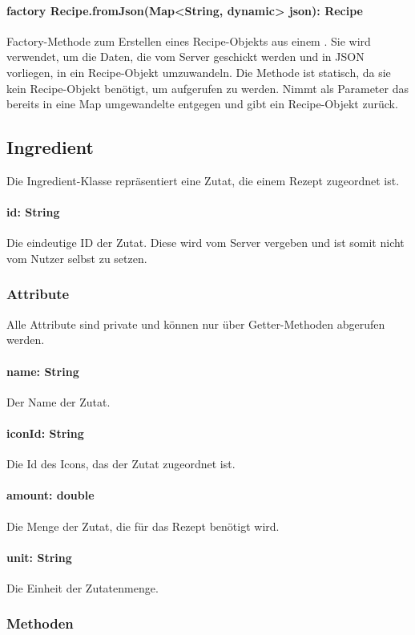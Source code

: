 \documentclass[parskip=full]{scrartcl}
\begin{document}
\paragraph{factory Recipe.fromJson(Map<String, dynamic> json): Recipe}
Factory-Methode zum Erstellen eines Recipe-Objekts aus einem . Sie wird verwendet, um die Daten, die vom Server geschickt werden und in \Gls{JSON} vorliegen, in ein Recipe-Objekt umzuwandeln. Die Methode ist statisch, da sie kein Recipe-Objekt benötigt, um aufgerufen zu werden. Nimmt als Parameter das bereits in eine Map umgewandelte  entgegen und gibt ein Recipe-Objekt zurück.

\subsection{Ingredient}
Die Ingredient-Klasse repräsentiert eine Zutat, die einem Rezept zugeordnet ist.
\paragraph{id: String}
Die eindeutige ID der Zutat. Diese wird vom Server vergeben und ist somit nicht vom Nutzer selbst zu setzen.
\subsubsection{Attribute}
Alle Attribute sind private und können nur über Getter-Methoden abgerufen werden.
\paragraph{name: String}
Der Name der Zutat.
\paragraph{iconId: String}
Die Id des Icons, das der Zutat zugeordnet ist.
\paragraph{amount: double}
Die Menge der Zutat, die für das Rezept benötigt wird.
\paragraph{unit: String}
Die Einheit der Zutatenmenge.

\subsubsection{Methoden}
\end{document}
